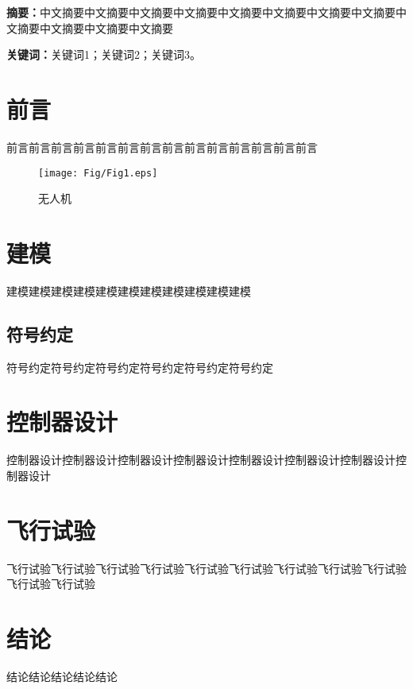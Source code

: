 





\textbf{摘要：}中文摘要中文摘要中文摘要中文摘要中文摘要中文摘要中文摘要中文摘要中文摘要中文摘要中文摘要中文摘要

\textbf{关键词：}关键词1；关键词2；关键词3。


\setlength{\parindent}{2em} 
\section{前言}
\label{intro}
前言前言前言前言前言前言前言前言前言前言前言前言前言前言
\begin{figure}[!h]
	\centering
	\texttt{[image: Fig/Fig1.eps]}
	\caption{无人机}
	\label{fig:1}     
\end{figure}
\section{建模}
\label{sec:1}
建模建模建模建模建模建模建模建模建模建模建模

\subsection{符号约定}
符号约定符号约定符号约定符号约定符号约定符号约定

\section{控制器设计}
控制器设计控制器设计控制器设计控制器设计控制器设计控制器设计控制器设计控制器设计

\section{飞行试验}
飞行试验飞行试验飞行试验飞行试验飞行试验飞行试验飞行试验飞行试验飞行试验飞行试验飞行试验
\section{结论}
结论结论结论结论结论